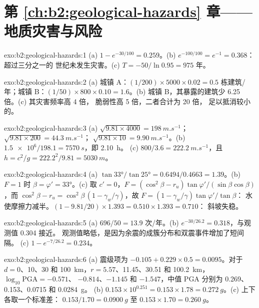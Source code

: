 \section*{第 \ref{ch:b2:geological-hazards} 章——地质灾害与风险}

\begin{solution}{exo:b2:geological-hazards:1}
(a) $1 - e^{-30/100} = 0.259$。(b) $e^{-100/100} = e^{-1} = 0.368$：超过三分之一的
世纪未发生灾害。(c) $T = -50/\ln 0.95 = 975$ 年。
\end{solution}

\begin{solution}{exo:b2:geological-hazards:2}
(a) 城镇 A：$(1/200) \times 5000 \times 0.02 = 0.5$ 栋建筑/年；城镇 B：$(1/50) \times 800
\times 0.10 = 1.6$。(b) 城镇 B，其暴露的建筑少 6.25 倍。(c) 其灾害频率高 4 倍，
脆弱性高 5 倍，二者合计为 20 倍，
足以抵消较小的。
\end{solution}

\begin{solution}{exo:b2:geological-hazards:3}
(a) $\sqrt{9.81 \times 4000} = \qty{198}{m.s^{-1}}$；$\sqrt{9.81 \times 200} = \qty{44.3}{m.s^{-1}}$；
$\sqrt{9.81 \times 10} = \qty{9.90}{m.s^{-1}}$。(b) $\num{1.5e6}/198.1 = \qty{7570}{s}$，即 \qty{2.10}{h}。
(c) $800/3.6 = \qty{222.2}{m.s^{-1}}$，且 $h = c^2/g = 222.2^2/9.81 = \qty{5030}{m}$。
\end{solution}

\begin{solution}{exo:b2:geological-hazards:4}
(a) $\tan\ang{33}/\tan\ang{25} = 0.6494/0.4663 = 1.39$。(b) $F = 1$ 时 $\beta = \varphi' =
\ang{33}$。(c) 取 $c' = 0$，$F = (\cos^2\beta - r_u)\tan\varphi'/(\sin\beta\cos\beta)$，而 $\cos^2\beta
- r_u = \cos^2\beta\,(1 - \gamma_w/\gamma)$，故 $F = (1 - \gamma_w/\gamma)\tan\varphi'/\tan\beta$：
水使摩擦力减半。$(1 - 9.81/20) \times 1.393 = 0.510 \times 1.393 = 0.710$：
斜坡失稳。
\end{solution}

\begin{solution}{exo:b2:geological-hazards:5}
(a) $696/50 = 13.9$ 次/年。(b) $e^{-30/26.2} = 0.318$，与观测值 0.304 接近。
观测值略低，是因为余震的成簇分布和双震事件增加了短间隔。
(c) $1 - e^{-7/26.2} = 0.234$。
\end{solution}

\begin{solution}{exo:b2:geological-hazards:6}
(a) 震级项为 $-0.105 + 0.229 \times 0.5 = 0.0095$。对于 $d = 0$、10、30 和
\qty{100}{km}，$r = 5.57$、11.45、30.51 和 \qty{100.2}{km}，$\log_{10}\mathrm{PGA} = -0.571$、
$-0.814$、$-1.145$ 和 $-1.547$，中值 PGA 分别为 0.269、0.153、0.0715 和 \qty{0.0284}{g}。
(b) $0.153 \times 10^{0.251} = 0.153 \times 1.78 = \qty{0.272}{g}$。(c) 上下各取一个标准差：
$0.153/1.70 = \qty{0.0900}{g}$ 至 $0.153 \times 1.70 = \qty{0.260}{g}$。
\end{solution}

